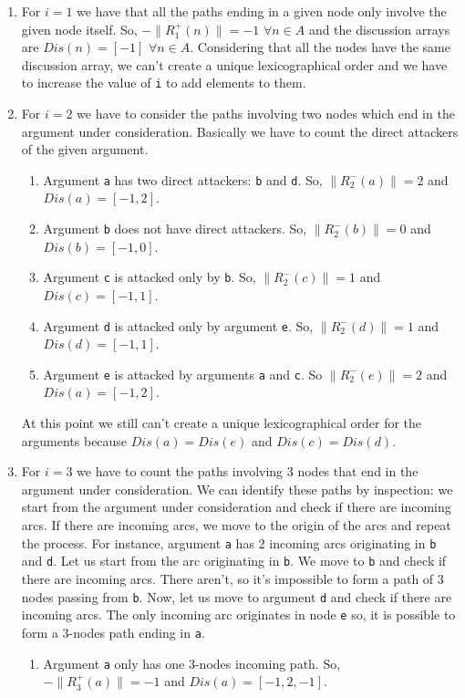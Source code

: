 \documentclass{scrbook}
\begin{document}
\begin{enumerate}
    \item 
    For $i=1$ we have that all the paths ending in a given node only involve the given node itself. So, $-\|R_1^+(n)\| = -1$ $\forall n \in A$ and the discussion arrays are $Dis(n) = [-1]$ $\forall n \in A$. Considering that all the nodes have the same discussion array, we can't create a unique lexicographical order and we have to increase the value of \texttt{i} to add elements to them.

    \item 
    For $i=2$ we have to consider the paths involving two nodes which end in the argument under consideration. Basically we have to count the direct attackers of the given argument.
    \begin{enumerate}[label=\alph*)]
        \item 
        Argument \texttt{a} has two direct attackers: \texttt{b} and \texttt{d}. So, $\|R_2^-(a)\|=2$ and $Dis(a)=[-1,2]$.

        \item 
        Argument \texttt{b} does not have direct attackers. So, $\|R_2^-(b)\|=0$ and $Dis(b)=[-1,0]$.

        \item 
        Argument \texttt{c} is attacked only by \texttt{b}. So, $\|R_2^-(c)\|=1$ and $Dis(c)=[-1,1]$.

        \item 
        Argument \texttt{d} is attacked only by argument \texttt{e}. So, $\|R_2^-(d)\|=1$ and $Dis(d)=[-1,1]$.

        \item 
        Argument \texttt{e} is attacked by arguments \texttt{a} and \texttt{c}. So $\|R_2^-(e)\|=2$ and $Dis(a)=[-1,2]$.
    \end{enumerate}

    At this point we still can't create a unique lexicographical order for the arguments because $Dis(a)=Dis(e)$ and $Dis(c)=Dis(d)$.

    \item 
    For $i=3$ we have to count the paths involving 3 nodes that end in the argument under consideration. We can identify these paths by inspection: we start from the argument under consideration and check if there are incoming arcs. If there are incoming arcs, we move to the origin of the arcs and repeat the process. For instance, argument \texttt{a} has 2 incoming arcs originating in \texttt{b} and \texttt{d}. Let us start from the arc originating in \texttt{b}. We move to \texttt{b} and check if there are incoming arcs. There aren't, so it's impossible to form a path of 3 nodes passing from \texttt{b}. Now, let us move to argument \texttt{d} and check if there are incoming arcs. The only incoming arc originates in node \texttt{e} so, it is possible to form a 3-nodes path ending in \texttt{a}.
    \begin{enumerate}[label=\alph*)]
        \item 
        Argument \texttt{a} only has one 3-nodes incoming path. So, $-\|R_3^+(a)\| = -1$ and $Dis(a)=[-1,2,-1]$.


\end{enumerate}
\end{enumerate}
\end{document}
